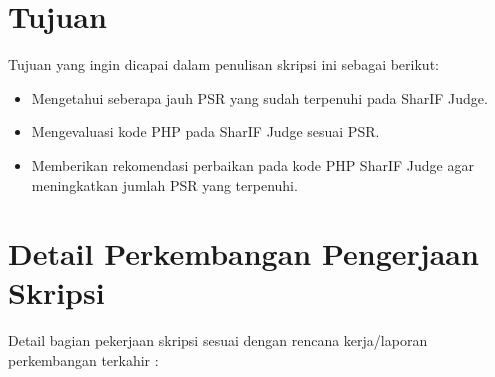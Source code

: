 \documentclass[a4paper,twoside]{article}
\begin{document}
\section{Tujuan}
Tujuan yang ingin dicapai dalam penulisan skripsi ini sebagai berikut:
\begin{itemize}
	\item Mengetahui seberapa jauh PSR yang sudah terpenuhi pada SharIF Judge.
	\item Mengevaluasi kode PHP pada SharIF Judge sesuai PSR.
	\item Memberikan rekomendasi perbaikan pada kode PHP SharIF Judge agar meningkatkan jumlah PSR yang terpenuhi.
\end{itemize}


\section{Detail Perkembangan Pengerjaan Skripsi}
Detail bagian pekerjaan skripsi sesuai dengan rencana kerja/laporan perkembangan terkahir :
\end{document}
